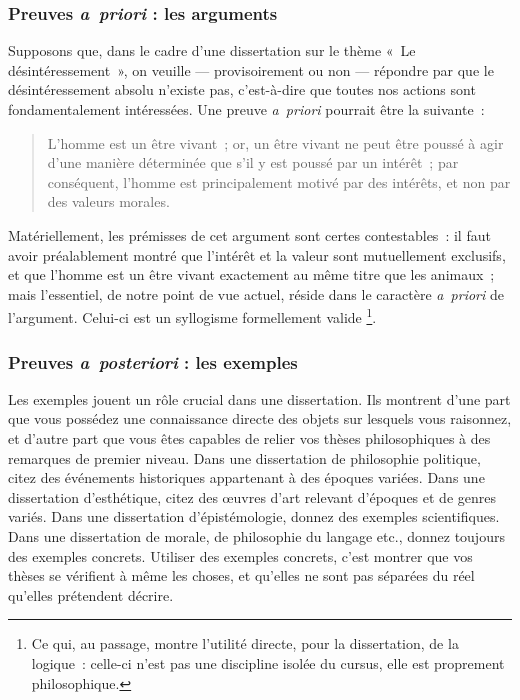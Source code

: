 \documentclass[a4paper]{article}
\begin{document}
\subsubsection{Preuves \emph{a priori} : les arguments}
\label{sec-3-4-1}


Supposons que, dans le cadre d'une dissertation sur le thème « Le
désintéressement », on veuille --- provisoirement ou non --- répondre par
que le désintéressement absolu n'existe pas, c'est-à-dire que toutes nos
actions sont fondamentalement intéressées. Une preuve \emph{a priori}
pourrait être la suivante :

\begin{quote}
L'homme est un être vivant ; or, un être vivant ne peut être poussé à
agir d'une manière déterminée que s'il y est poussé par un intérêt ;
par conséquent, l'homme est principalement motivé par des intérêts, et
non par des valeurs morales.
\end{quote}

Matériellement, les prémisses de cet argument sont certes contestables :
il faut avoir préalablement montré que l'intérêt et la valeur sont
mutuellement exclusifs, et que l'homme est un être vivant exactement au
même titre que les animaux ; mais l'essentiel, de notre point de vue
actuel, réside dans le caractère \emph{a priori} de l'argument. Celui-ci est
un syllogisme formellement valide \footnote{Ce qui, au passage, montre l'utilité directe, pour la dissertation,
    de la logique : celle-ci n'est pas une discipline isolée du cursus,
    elle est proprement philosophique.
 }.
\subsubsection{Preuves \emph{a posteriori} : les exemples}
\label{sec-3-4-2}


Les exemples jouent un rôle crucial dans une dissertation. Ils montrent
d'une part que vous possédez une connaissance directe des objets sur
lesquels vous raisonnez, et d'autre part que vous êtes capables de
relier vos thèses philosophiques à des remarques de premier niveau. Dans
une dissertation de philosophie politique, citez des événements
historiques appartenant à des époques variées. Dans une dissertation
d'esthétique, citez des œuvres d'art relevant d'époques et de genres
variés. Dans une dissertation d'épistémologie, donnez des exemples
scientifiques. Dans une dissertation de morale, de philosophie du
langage etc., donnez toujours des exemples concrets. Utiliser des
exemples concrets, c'est montrer que vos thèses se vérifient à même les
choses, et qu'elles ne sont pas séparées du réel qu'elles prétendent
décrire.
\end{document}

